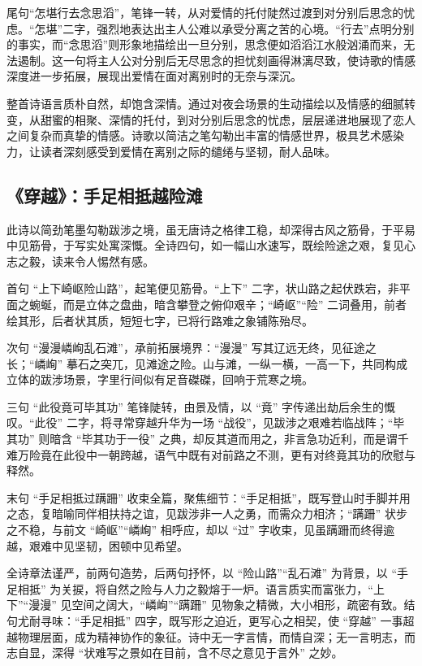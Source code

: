 \documentclass{article}
\begin{document}
尾句“怎堪行去念思滔”，笔锋一转，从对爱情的托付陡然过渡到对分别后思念的忧虑。“怎堪”二字，强烈地表达出主人公难以承受分离之苦的心境。“行去”点明分别的事实，而“念思滔”则形象地描绘出一旦分别，思念便如滔滔江水般汹涌而来，无法遏制。这一句将主人公对分别后无尽思念的担忧刻画得淋漓尽致，使诗歌的情感深度进一步拓展，展现出爱情在面对离别时的无奈与深沉。

整首诗语言质朴自然，却饱含深情。通过对夜会场景的生动描绘以及情感的细腻转变，从甜蜜的相聚、深情的托付，到对分别后思念的忧虑，层层递进地展现了恋人之间复杂而真挚的情感。诗歌以简洁之笔勾勒出丰富的情感世界，极具艺术感染力，让读者深刻感受到爱情在离别之际的缱绻与坚韧，耐人品味。

\subsection{《穿越》：手足相抵越险滩}\label{sec:chuan-yue}

此诗以简劲笔墨勾勒跋涉之境，虽无唐诗之格律工稳，却深得古风之筋骨，于平易中见筋骨，于写实处寓深慨。全诗四句，如一幅山水速写，既绘险途之艰，复见心志之毅，读来令人惕然有感。

首句 “上下崎岖险山路”，起笔便见筋骨。“上下” 二字，状山路之起伏跌宕，非平面之蜿蜒，而是立体之盘曲，暗含攀登之俯仰艰辛；“崎岖”“险” 二词叠用，前者绘其形，后者状其质，短短七字，已将行路难之象铺陈殆尽。

次句 “漫漫嶙峋乱石滩”，承前拓展境界：“漫漫” 写其辽远无终，见征途之长；“嶙峋” 摹石之突兀，见滩途之险。山与滩，一纵一横，一高一下，共同构成立体的跋涉场景，字里行间似有足音磔磔，回响于荒寒之境。

三句 “此役竟可毕其功” 笔锋陡转，由景及情，以 “竟” 字传递出劫后余生的慨叹。“此役” 二字，将寻常穿越升华为一场 “战役”，见跋涉之艰难若临战阵；“毕其功” 则暗含 “毕其功于一役” 之典，却反其道而用之，非言急功近利，而是谓千难万险竟在此役中一朝跨越，语气中既有对前路之不测，更有对终竟其功的欣慰与释然。

末句 “手足相抵过蹒跚” 收束全篇，聚焦细节：“手足相抵”，既写登山时手脚并用之态，复暗喻同伴相扶持之谊，见跋涉非一人之勇，而需众力相济；“蹒跚” 状步之不稳，与前文 “崎岖”“嶙峋” 相呼应，却以 “过” 字收束，见虽蹒跚而终得逾越，艰难中见坚韧，困顿中见希望。

全诗章法谨严，前两句造势，后两句抒怀，以 “险山路”“乱石滩” 为背景，以 “手足相抵” 为关捩，将自然之险与人力之毅熔于一炉。语言质实而富张力，“上下”“漫漫” 见空间之阔大，“嶙峋”“蹒跚” 见物象之精微，大小相形，疏密有致。结句尤耐寻味：“手足相抵” 四字，既写形之迫近，更写心之相契，使 “穿越” 一事超越物理层面，成为精神协作的象征。诗中无一字言情，而情自深；无一言明志，而志自显，深得 “状难写之景如在目前，含不尽之意见于言外” 之妙。
\end{document}
